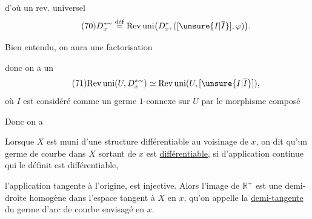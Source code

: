 
d'où un rev. universel
\[
\tag{70}
D_x^{*\sim}\overset{\mathrm{d\acute ef}}{=}
\mathrm{Rev\,uni}\bigl(D_x^*,([\unsure{I|\overline I}],\varphi)\bigr).
\]

Bien entendu, on aura une factorisation

donc on a un 
\[
\tag{71}
\mathrm{Rev\,uni}(U,D_x^{*\sim})\simeq
\mathrm{Rev\,uni}(U,[\unsure{I|\overline I}]),
\]
où $I$ est considéré comme un germe $1$-connexe sur $U$ par le morphisme composé

Donc on a

Lorsque $X$ est muni d'une structure différentiable au voisinage de $x$, on dit qu'un germe de courbe dans $X$ sortant de $x$ est \uline{différentiable}, si   d'application continue
qui le définit est différentiable, 


l'application tangente à l'origine, 
est injective. Alors l'image de $\mathbb R^+$ est une demi-droite homogène dans l'espace tangent à $X$ en $x$, qu'on appelle la \uline{demi-tangente} du germe d'arc de courbe envisagé en $x$.

